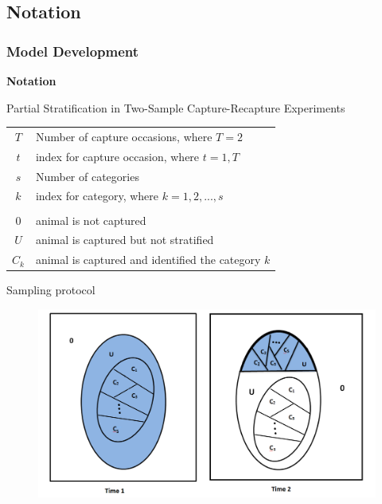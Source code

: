 \documentclass{beamer}
\begin{document}
\subsection{Notation} 
\begin{frame} \frametitle{Model Development}
\textbf{{\footnotesize Notation}}

{\scriptsize Partial Stratification in Two-Sample Capture-Recapture Experiments
\begin{center}
\begin{tabular}{c l}
$T$ & Number of capture occasions,  where $ T = 2$\\
$t$ & index for capture occasion, where $t = 1, T$\\
$s$ & Number of categories\\
$k$ & index for category, where $k = 1,2,...,s$ \\
& \\
$0$ &animal is not captured \\
$U$ &animal is captured but not stratified\\
$C_{k}$ &animal is captured and identified the category $k$\\
\end{tabular}
\end{center}
}

{\scriptsize Sampling protocol}
\begin{figure}[h]
    \centering
    \includegraphics[scale=0.17]{CaptureReCap_General.png}
\end{figure}
\end{frame}
\end{document}
